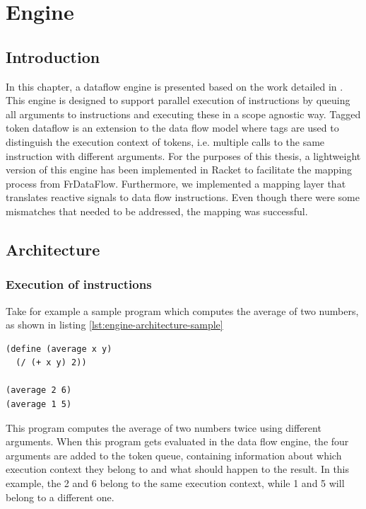 \chapter{Engine}

\section{Introduction}

In this chapter, a dataflow engine is presented based on the work detailed in \citet{jennifer_extensible_2017}.
This engine is designed to support parallel execution of instructions by queuing all arguments to instructions and executing these in a scope agnostic way.
Tagged token dataflow is an extension to the data flow model where tags are used to distinguish the execution context of tokens, i.e. multiple calls to the same instruction with different arguments.
For the purposes of this thesis, a lightweight version of this engine has been implemented in Racket to facilitate the mapping process from FrDataFlow. Furthermore, we implemented a mapping layer that translates reactive signals to data flow instructions. Even though there were some mismatches that needed to be addressed, the mapping was successful. 

\newpage
\section{Architecture}

\subsection{Execution of instructions}

Take for example a sample program which computes the average of two numbers, as shown in listing \ref{lst:engine-architecture-sample}

\begin{lstlisting}[caption={Computing the average of two numbers},captionpos=b,label={lst:engine-architecture-sample}]
(define (average x y)
  (/ (+ x y) 2))
  
(average 2 6)
(average 1 5)
\end{lstlisting}

This program computes the average of two numbers twice using different arguments. When this program gets evaluated in the data flow engine, the four arguments are added to the token queue, containing information about which execution context they belong to and what should happen to the result. 
In this example, the 2 and 6 belong to the same execution context, while 1 and 5 will belong to a different one. 

